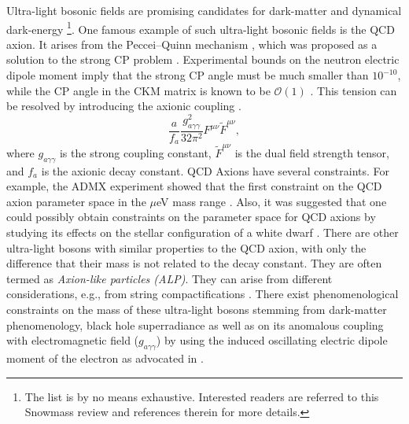 \par
Ultra-light bosonic fields are promising candidates for dark-matter \cite{GrillidiCortona:2015jxo, Sanchis-Gual:2022ooi, Goldstein:2022pxu, Schutz:2020jox} and  dynamical dark-energy \cite{Kamionkowski:2014zda}
\footnote{The list is by no means exhaustive.  Interested readers are referred to this Snowmass review \cite{Adams:2022pbo} and references therein for more details.}. One famous example of such ultra-light bosonic fields is the QCD axion. It arises from the Peccei--Quinn mechanism \cite{Fukuda:2021drn,CAPP:2020utb,Sakhelashvili:2021eid, Peccei:2006as, RevModPhys.82.557,PhysRevLett.40.223,PhysRevLett.40.279,Preskill:1982cy,Gorghetto:2018ocs,DiLuzio:2021pxd,Berezhiani:2000gh,Fukuda:2015ana,Dimopoulos:2016lvn,Gherghetta:2016fhp,Kim:1998va,DiLuzio:2020wdo,Conlon:2006tq,Chakraborty:2021fkp,Harigaya:2019qnl}, which was proposed as a solution to the strong CP problem \cite{PhysRevLett.38.1440,PhysRevD.16.1791,PhysRevLett.40.279,Clowe:2006eq,Hsu:2004mf,Agrawal:2017ksf,Gupta:2020vxb,PhysRevLett.43.103}. Experimental bounds on the neutron electric dipole moment imply that the strong CP angle must be much smaller than $10^{-10}$, while the CP angle in the CKM matrix is known to be $\mathcal{O}(1)$ \cite{Baker:2006ts}. This tension can be resolved by introducing the axionic coupling \cite{Huang:2018pbu, Zhang:2021mks}.$$\frac{a}{f_a}\frac{g_{a\gamma\gamma}^2}{32\pi^2}F^{\mu\nu}\tilde{F}^{\mu\nu},$$
where $g_{a\gamma\gamma}$ is the strong coupling constant, $\tilde{F}^{\mu\nu}$ is the dual field strength tensor, and $f_a$ is the axionic decay constant. QCD Axions have several constraints.  For example, the ADMX experiment showed that the first constraint on the QCD axion parameter space in the $\mu$eV mass range \cite{PhysRevLett.120.151301}.  Also, it was suggested that one could possibly obtain constraints on the parameter space for QCD axions by studying its effects on the stellar configuration of a white dwarf \cite{Balkin:2022qer}.  There are other ultra-light bosons with similar properties to the QCD axion, with only the difference that their mass is not related to the decay constant.  They are often termed as \textit{Axion-like particles (ALP)}. They can arise from different considerations, e.g., from string compactifications  \cite{Cicoli:2013ana,Svrcek:2006hf,Hiramatsu:2010yu}.  There exist phenomenological constraints on the mass of these ultra-light bosons stemming from dark-matter phenomenology, black hole superradiance  \cite{Arias:2012az, DiLuzio:2021pxd, QuilezLasanta:2021yzt, Ishii:2022lwc, 
 Cardoso:2018tly, Brito:2015oca,Ghosh:2023tyz} as well as on its anomalous coupling with electromagnetic field ($g_{a\gamma\gamma}$) by using the induced oscillating electric dipole moment of the electron as advocated in \cite{Hill:2015vma}.
